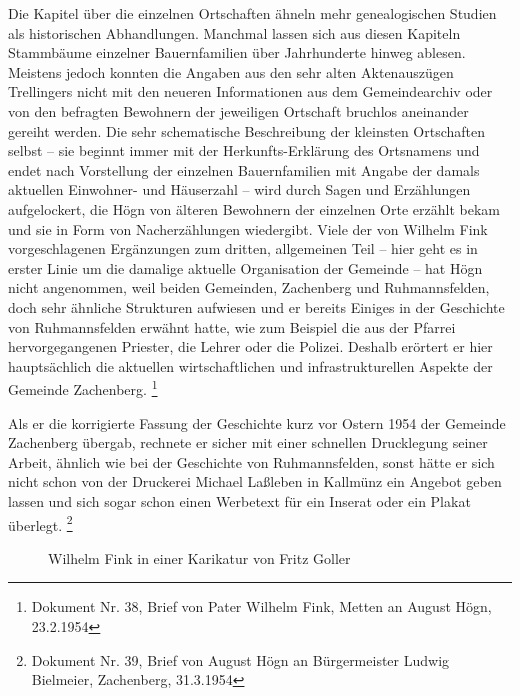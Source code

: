 Die Kapitel über die einzelnen Ortschaften ähneln mehr genealogischen
Studien als historischen Abhandlungen. Manchmal lassen sich aus diesen
Kapiteln Stammbäume einzelner Bauernfamilien über Jahrhunderte hinweg
ablesen. Meistens jedoch konnten die Angaben aus den sehr alten
Aktenauszügen Trellingers nicht mit den neueren Informationen aus dem
Gemeindearchiv oder von den befragten Bewohnern der jeweiligen
Ortschaft bruchlos aneinander gereiht werden. Die sehr schematische
Beschreibung der kleinsten Ortschaften selbst – sie beginnt immer mit
der Herkunfts-Erklärung des Ortsnamens und endet nach Vorstellung der
einzelnen Bauernfamilien mit Angabe der damals aktuellen Einwohner- und
Häuserzahl – wird durch Sagen und Erzählungen aufgelockert, die Högn
von älteren Bewohnern der einzelnen Orte erzählt bekam und sie in Form
von Nacherzählungen wiedergibt. Viele der von Wilhelm Fink
vorgeschlagenen Ergänzungen zum dritten, allgemeinen Teil – hier geht
es in erster Linie um die damalige aktuelle Organisation der Gemeinde –
hat Högn nicht angenommen, weil beiden Gemeinden, Zachenberg und
Ruhmannsfelden, doch sehr ähnliche Strukturen aufwiesen und er bereits
Einiges in der Geschichte von Ruhmannsfelden erwähnt hatte, wie zum
Beispiel die aus der Pfarrei hervorgegangenen Priester, die Lehrer oder
die Polizei. Deshalb erörtert er hier hauptsächlich die aktuellen
wirtschaftlichen und infrastrukturellen Aspekte der Gemeinde
Zachenberg. \footnote{Dokument Nr. 38, Brief von Pater Wilhelm Fink,
Metten an August Högn, 23.2.1954}

Als er die korrigierte Fassung der Geschichte kurz vor Ostern 1954 der
Gemeinde Zachenberg übergab, rechnete er sicher mit einer schnellen
Drucklegung seiner Arbeit, ähnlich wie bei der Geschichte von
Ruhmannsfelden, sonst hätte er sich nicht schon von der Druckerei
Michael Laßleben in Kallmünz ein Angebot geben lassen und sich sogar
schon einen Werbetext für ein Inserat oder ein Plakat
überlegt. \footnote{Dokument Nr. 39, Brief von August Högn an
Bürgermeister Ludwig Bielmeier, Zachenberg, 31.3.1954}

\begin{figure}
\caption{Wilhelm Fink in einer Karikatur von Fritz Goller}
\end{figure}

